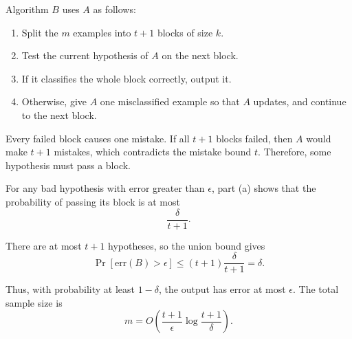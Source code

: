 \documentclass[11pt]{article}
\begin{document}
Algorithm \(B\) uses \(A\) as follows:
\begin{enumerate}[leftmargin=*,itemsep=2pt]
    \item Split the \(m\) examples into \(t+1\) blocks of size \(k\).
    \item Test the current hypothesis of \(A\) on the next block.
    \item If it classifies the whole block correctly, output it.
    \item Otherwise, give \(A\) one misclassified example so that \(A\)
    updates, and continue to the next block.
\end{enumerate}

Every failed block causes one mistake. If all \(t+1\) blocks failed, then
\(A\) would make \(t+1\) mistakes, which contradicts the mistake bound
\(t\). Therefore, some hypothesis must pass a block.

For any bad hypothesis with error greater than \(\epsilon\), part (a) shows
that the probability of passing its block is at most
\[
\frac{\delta}{t+1}.
\]

There are at most \(t+1\) hypotheses, so the union bound gives
\[
\Pr[\mathrm{err}(B)>\epsilon]
\le
(t+1)\frac{\delta}{t+1}
=
\delta.
\]

Thus, with probability at least \(1-\delta\), the output has error at most
\(\epsilon\). The total sample size is
\[
\boxed{
m=
O\!\left(
\frac{t+1}{\epsilon}
\log\frac{t+1}{\delta}
\right).
}
\]
\end{document}

